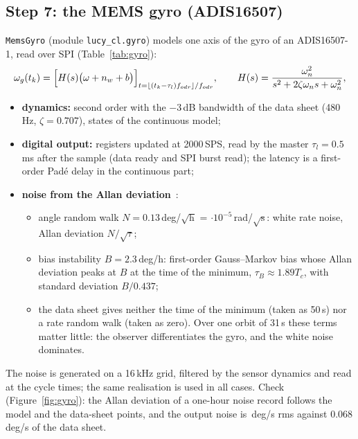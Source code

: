 \documentclass[10pt,a4paper]{article}
\numberwithin{equation}{section}
\begin{document}
\subsection{Step 7: the MEMS gyro (ADIS16507)}\label{sec:gyro}
\texttt{MemsGyro} (module \texttt{lucy\_cl.gyro}) models one axis of the gyro of an ADIS16507-1, read over SPI (Table~\ref{tab:gyro}):
\begin{equation}
\omega_g(t_k)=\Bigl[H(s)\bigl(\omega+n_w+b\bigr)\Bigr]_{t=\lfloor(t_k-\tau_l)f_{odr}\rfloor/f_{odr}},\qquad H(s)=\frac{\omega_n^2}{s^2+2\zeta\omega_ns+\omega_n^2},
\end{equation}
\begin{itemize}
\item \textbf{dynamics:} second order with the $-3$\,dB bandwidth of the data sheet (480\,Hz, $\zeta=0.707$), states of the continuous model;
\item \textbf{digital output:} registers updated at 2000\,SPS, read by the master $\tau_l=0.5$\,ms after the sample (data ready and SPI burst read); the latency is a first-order Pad\'e delay in the continuous part;
\item \textbf{noise from the Allan deviation}~\cite{ieee952}:
  \begin{itemize}
  \item angle random walk $N=0.13$\,deg/$\sqrt{\mathrm h}$ = \arwSI$\cdot10^{-5}$\,rad/$\sqrt{\mathrm s}$: white rate noise, Allan deviation $N/\sqrt\tau$;
  \item bias instability $B=2.3$\,deg/h: first-order Gauss--Markov bias whose Allan deviation peaks at $B$ at the time of the minimum, $\tau_B\approx1.89T_c$, with standard deviation $B/0.437$;
  \item the data sheet gives neither the time of the minimum (taken as 50\,s) nor a rate random walk (taken as zero). Over one orbit of 31\,s these terms matter little: the observer differentiates the gyro, and the white noise dominates.
  \end{itemize}
\end{itemize}
The noise is generated on a 16\,kHz grid, filtered by the sensor dynamics and read at the cycle times; the same realisation is used in all cases. Check (Figure~\ref{fig:gyro}): the Allan deviation of a one-hour noise record follows the model and the data-sheet points, and the output noise is \gyroNoise\,deg/s rms against 0.068\,deg/s of the data sheet.
\end{document}
